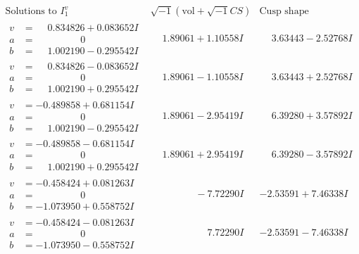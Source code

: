 \documentclass[1p]{elsarticle_modified}
\theoremstyle{definition}
\newcommand{\I}{\sqrt{-1}}
\begin{document}
$$\begin{array}{c|c|c}  
\text{Solutions to }I^v_{1}& \I (\text{vol} + \sqrt{-1}CS) & \text{Cusp shape}\\
 \hline 
\begin{aligned}
v &= \phantom{-}0.834826 + 0.083652 I \\
a &= \phantom{-0.000000 } 0 \\
b &= \phantom{-}1.002190 - 0.295542 I\end{aligned}
 & \phantom{-}1.89061 + 1.10558 I & \phantom{-}3.63443 - 2.52768 I \\ \hline\begin{aligned}
v &= \phantom{-}0.834826 - 0.083652 I \\
a &= \phantom{-0.000000 } 0 \\
b &= \phantom{-}1.002190 + 0.295542 I\end{aligned}
 & \phantom{-}1.89061 - 1.10558 I & \phantom{-}3.63443 + 2.52768 I \\ \hline\begin{aligned}
v &= -0.489858 + 0.681154 I \\
a &= \phantom{-0.000000 } 0 \\
b &= \phantom{-}1.002190 - 0.295542 I\end{aligned}
 & \phantom{-}1.89061 - 2.95419 I & \phantom{-}6.39280 + 3.57892 I \\ \hline\begin{aligned}
v &= -0.489858 - 0.681154 I \\
a &= \phantom{-0.000000 } 0 \\
b &= \phantom{-}1.002190 + 0.295542 I\end{aligned}
 & \phantom{-}1.89061 + 2.95419 I & \phantom{-}6.39280 - 3.57892 I \\ \hline\begin{aligned}
v &= -0.458424 + 0.081263 I \\
a &= \phantom{-0.000000 } 0 \\
b &= -1.073950 + 0.558752 I\end{aligned}
 & \phantom{-0.000000 } -7.72290 I & -2.53591 + 7.46338 I \\ \hline\begin{aligned}
v &= -0.458424 - 0.081263 I \\
a &= \phantom{-0.000000 } 0 \\
b &= -1.073950 - 0.558752 I\end{aligned}
 & \phantom{-0.000000 -}7.72290 I & -2.53591 - 7.46338 I \\ \hline\begin{aligned}

\end{aligned}
\end{array}$$
\end{document}
